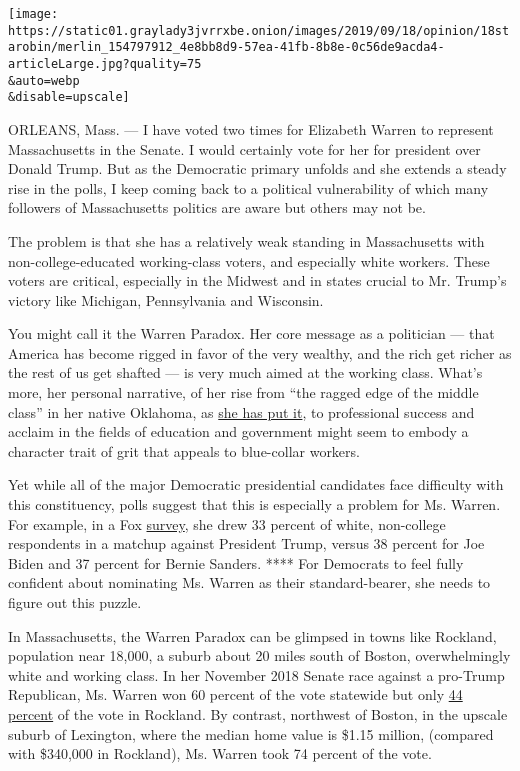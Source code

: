 \texttt{[image: https://static01.graylady3jvrrxbe.onion/images/2019/09/18/opinion/18starobin/merlin\_154797912\_4e8bb8d9-57ea-41fb-8b8e-0c56de9acda4-articleLarge.jpg?quality=75\\\&auto=webp\\\&disable=upscale]}

ORLEANS, Mass. --- I have voted two times for Elizabeth Warren to
represent Massachusetts in the Senate. I would certainly vote for her
for president over Donald Trump. But as the Democratic primary unfolds
and she extends a steady rise in the polls, I keep coming back to a
political vulnerability of which many followers of Massachusetts
politics are aware but others may not be.

The problem is that she has a relatively weak standing in Massachusetts
with non-college-educated working-class voters, and especially white
workers. These voters are critical, especially in the Midwest and in
states crucial to Mr. Trump's victory like Michigan, Pennsylvania and
Wisconsin.

You might call it the Warren Paradox. Her core message as a politician
--- that America has become rigged in favor of the very wealthy, and the
rich get richer as the rest of us get shafted --- is very much aimed at
the working class. What's more, her personal narrative, of her rise from
``the ragged edge of the middle class'' in her native Oklahoma, as
\href{https://twitter.com/ewarren/status/1133840956158042115?lang=en}{she
has put it}, to professional success and acclaim in the fields of
education and government might seem to embody a character trait of grit
that appeals to blue-collar workers.

Yet while all of the major Democratic presidential candidates face
difficulty with this constituency, polls suggest that this is especially
a problem for Ms. Warren. For example, in a Fox
\href{https://www.foxnews.com/politics/fox-news-poll-8-15}{survey}, she
drew 33 percent of white, non-college respondents in a matchup against
President Trump, versus 38 percent for Joe Biden and 37 percent for
Bernie Sanders. **** For Democrats to feel fully confident about
nominating Ms. Warren as their standard-bearer, she needs to figure out
this puzzle.

In Massachusetts, the Warren Paradox can be glimpsed in towns like
Rockland, population near 18,000, a suburb about 20 miles south of
Boston, overwhelmingly white and working class. In her November 2018
Senate race against a pro-Trump Republican, Ms. Warren won 60 percent of
the vote statewide but only
\href{https://www.wbur.org/news/2018/11/06/warren-beats-geoff-diehl}{44
percent} of the vote in Rockland. By contrast, northwest of Boston, in
the upscale suburb of Lexington, where the median home value is \$1.15
million, (compared with \$340,000 in Rockland), Ms. Warren took 74
percent of the vote.

